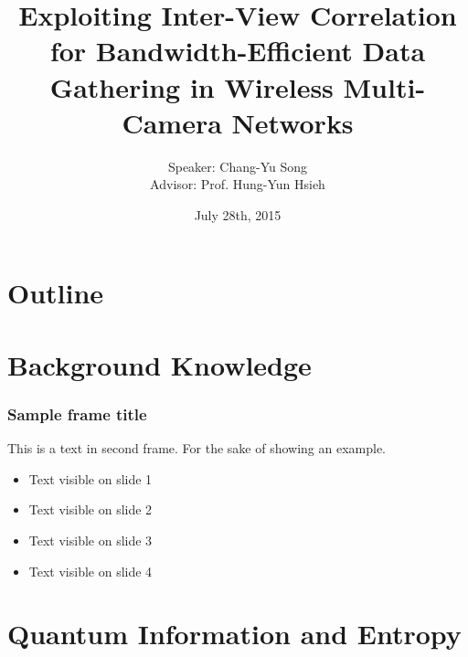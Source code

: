 \documentclass[xcolor=svgnames,handout]{beamer}
\title
  [Exploiting Inter-View Correlation for Bandwidth-Efficient Data Gathering in Wireless Multi-Camera Networks\hspace{2em}]
  {Exploiting Inter-View Correlation for Bandwidth-Efficient Data Gathering in Wireless Multi-Camera Networks}
\author
  []
  {Speaker: Chang-Yu Song \\
   Advisor: Prof. Hung-Yun Hsieh}
\date
  {July 28th, 2015}
\institute
  {TONIC Research Group \\
  Graduate Institute of Communication Engineering \\
   National Taiwan University}
\begin{document}
\maketitle

\section{Outline}


\section{Background Knowledge}
\begin{frame}
\frametitle{Sample frame title}
This is a text in second frame. 
For the sake of showing an example.
 
\begin{itemize}
 \item<1-> Text visible on slide 1
 \item<2-> Text visible on slide 2
 \item<3> Text visible on slide 3
 \item<4-> Text visible on slide 4
\end{itemize}
 
\end{frame}



\section{Quantum Information and Entropy}








\end{document}
